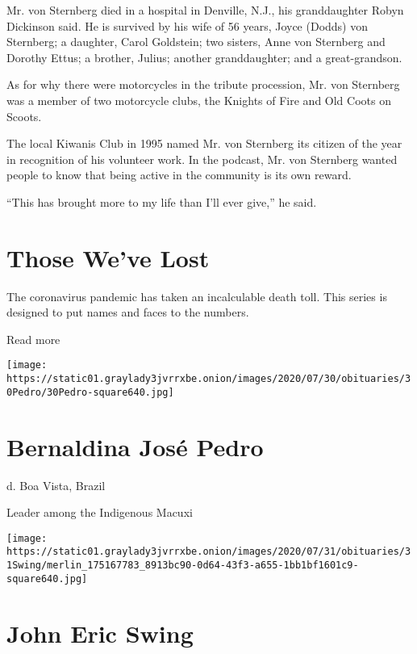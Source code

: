 Mr. von Sternberg died in a hospital in Denville, N.J., his
granddaughter Robyn Dickinson said. He is survived by his wife of 56
years, Joyce (Dodds) von Sternberg; a daughter, Carol Goldstein; two
sisters, Anne von Sternberg and Dorothy Ettus; a brother, Julius;
another granddaughter; and a great-grandson.

As for why there were motorcycles in the tribute procession, Mr. von
Sternberg was a member of two motorcycle clubs, the Knights of Fire and
Old Coots on Scoots.

The local Kiwanis Club in 1995 named Mr. von Sternberg its citizen of
the year in recognition of his volunteer work. In the podcast, Mr. von
Sternberg wanted people to know that being active in the community is
its own reward.

``This has brought more to my life than I'll ever give,'' he said.

\href{https://www.nytimes3xbfgragh.onion/interactive/2020/obituaries/people-died-coronavirus-obituaries.html?action=click\&pgtype=Article\&state=default\&region=BELOW_MAIN_CONTENT\&context=covid_obits_promo}{}

\hypertarget{those-weve-lost}{%
\section{Those We've Lost}\label{those-weve-lost}}

The coronavirus pandemic has taken an incalculable death toll. This
series is designed to put names and faces to the numbers.

Read more

\texttt{[image: https://static01.graylady3jvrrxbe.onion/images/2020/07/30/obituaries/30Pedro/30Pedro-square640.jpg]}

\hypertarget{bernaldina-josuxe9-pedro}{%
\section{Bernaldina José Pedro}\label{bernaldina-josuxe9-pedro}}

d. Boa Vista, Brazil

Leader among the Indigenous Macuxi

\texttt{[image: https://static01.graylady3jvrrxbe.onion/images/2020/07/31/obituaries/31Swing/merlin\_175167783\_8913bc90-0d64-43f3-a655-1bb1bf1601c9-square640.jpg]}

\hypertarget{john-eric-swing}{%
\section{John Eric Swing}\label{john-eric-swing}}

